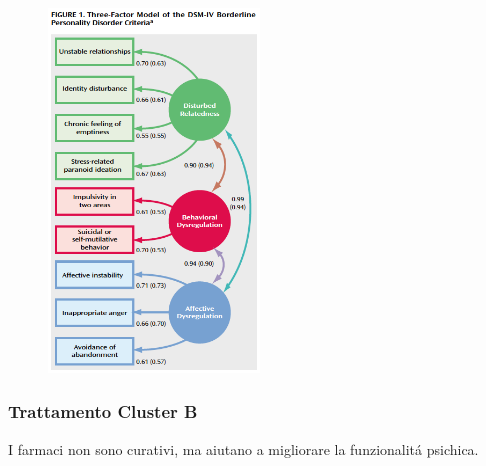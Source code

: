 \begin{figure}[!ht]
\centering
	\includegraphics[width=0.5\textwidth]{011/image8.png}
\end{figure}

\subsubsection{Trattamento Cluster B}

I farmaci non sono curativi, ma aiutano a migliorare la funzionalitá
psichica.

